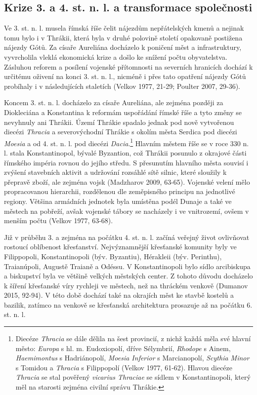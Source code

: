 \subsection[krize-3.-a-4.-st.-n.-l.-a-transformace-společnosti]{Krize 3. a 4. st. n. l. a transformace společnosti}

Ve 3. st. n. l. musela římská říše čelit nájezdům nepřátelských kmenů a nejinak tomu bylo i v Thrákii, která byla v druhé polovině století opakovaně postižena nájezdy Gótů. Za císaře Aureliána docházelo k poničení měst a infrastruktury, vyvrcholila vleklá ekonomická krize a došlo ke snížení počtu obyvatelstva. Zásluhou reforem a posílení vojenské přítomnosti na severních hranicích dochází k určitému oživení na konci 3. st. n. l., nicméně i přes tato opatření nájezdy Gótů probíhaly i v následujících staletích (Velkov 1977, 21-29; Poulter 2007, 29-36).

Koncem 3. st. n. l. docházelo za císaře Aureliána, ale zejména později za Diokleciána a Konstantina k reformám uspořádání římské říše a tyto změny se nevyhnuly ani Thrákii. Území Thrákie spadalo jednak pod nově vytvořenou diecézi {\em Thracia} a severovýchodní Thrákie s okolím města Serdica pod diecézi {\em Moesia} a od 4. st. n. l. pod diecézi {\em Dacia}.\footnote{Diecéze {\em Thracia} se dále dělila na šest provincií, z nichž každá měla své hlavní město: {\em Europa} s hl. m. Eudoxiopolí, dříve Sélymbrií, {\em Rhodope} s Ainem, {\em Haemimontus} s Hadriánopolí, {\em Moesia Inferior} s Marcianopolí, {\em Scythia Minor} s Tomidou a {\em Thracia} s Filippopolí (Velkov 1977, 61-62). Hlavou diecéze {\em Thracia} se stal pověřený {\em vicarius Thraciae} se sídlem v Konstantinopoli, který měl na starosti zejména civilní správu Thrákie.} Hlavním městem říše se v roce 330 n. l. stala Konstantinopol, bývalé Byzantion, což Thrákii posunulo z okrajové části římského impéria rovnou do jejího středu. S přesunutím hlavního města souvisí i zvýšení stavebních aktivit a udržování rozsáhlé sítě silnic, které sloužily k přepravě zboží, ale zejména vojsk (Madzharov 2009, 63-65). Vojenské velení mělo propracovanou hierarchii, rozdělenou dle zeměpisného principu na jednotlivé regiony. Většina armádních jednotek byla umístěna podél Dunaje a také ve městech na pobřeží, avšak vojenské tábory se nacházely i ve vnitrozemí, ovšem v menším počtu (Velkov 1977, 63-68).

Již v průběhu 3. a zejména na počátku 4. st. n. l. začíná veřejný život ovlivňovat rostoucí oblíbenost křesťanství. Nejvýznamnější křesťanské komunity byly ve Filippopoli, Konstantinopoli (býv. Byzantiu), Hérakleii (býv. Perinthu), Traianúpoli, Augustě Traianě a Odéssu. V Konstantinopoli bylo sídlo arcibiskupa a biskupství byla ve většině velkých městských center. Z tohoto důvodu docházelo k šíření křesťanské víry rychleji ve městech, než na thráckém venkově (Dumanov 2015, 92-94). V této době dochází také na okrajích měst ke stavbě kostelů a bazilik, zatímco na venkově se křesťanská architektura prosazuje až na počátku 6. st. n. l.

